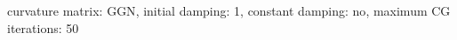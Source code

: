 curvature matrix: $\text{GGN}$, initial damping: 1, constant damping: $\text{no}$, maximum CG iterations: 50